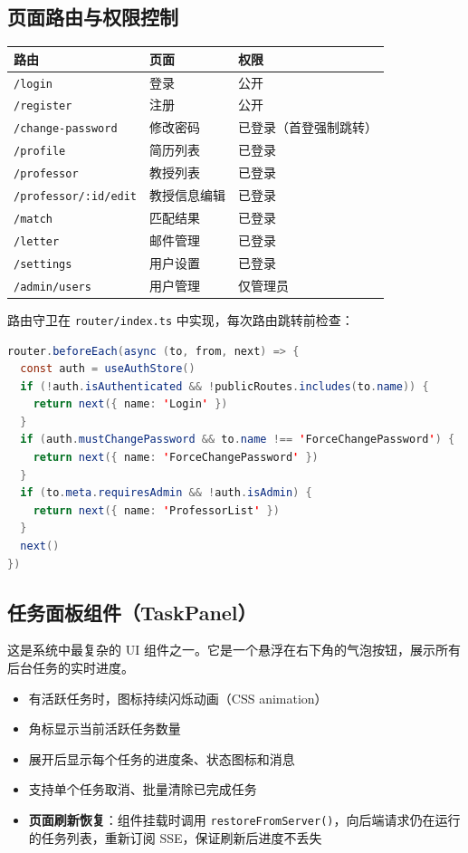 \documentclass[11pt]{article}
\begin{document}
\subsection{页面路由与权限控制}

\begin{center}
\begin{tabular}{|l|l|l|}
\hline
\textbf{路由} & \textbf{页面} & \textbf{权限} \\
\hline
\texttt{/login} & 登录 & 公开 \\
\texttt{/register} & 注册 & 公开 \\
\texttt{/change-password} & 修改密码 & 已登录（首登强制跳转） \\
\texttt{/profile} & 简历列表 & 已登录 \\
\texttt{/professor} & 教授列表 & 已登录 \\
\texttt{/professor/:id/edit} & 教授信息编辑 & 已登录 \\
\texttt{/match} & 匹配结果 & 已登录 \\
\texttt{/letter} & 邮件管理 & 已登录 \\
\texttt{/settings} & 用户设置 & 已登录 \\
\texttt{/admin/users} & 用户管理 & 仅管理员 \\
\hline
\end{tabular}
\end{center}

路由守卫在 \texttt{router/index.ts} 中实现，每次路由跳转前检查：

\begin{lstlisting}[language=Java, caption=Vue Router 全局前置守卫]
router.beforeEach(async (to, from, next) => {
  const auth = useAuthStore()
  if (!auth.isAuthenticated && !publicRoutes.includes(to.name)) {
    return next({ name: 'Login' })
  }
  if (auth.mustChangePassword && to.name !== 'ForceChangePassword') {
    return next({ name: 'ForceChangePassword' })
  }
  if (to.meta.requiresAdmin && !auth.isAdmin) {
    return next({ name: 'ProfessorList' })
  }
  next()
})
\end{lstlisting}

\subsection{任务面板组件（TaskPanel）}

这是系统中最复杂的 UI 组件之一。它是一个悬浮在右下角的气泡按钮，展示所有后台任务的实时进度。

\begin{itemize}
    \item 有活跃任务时，图标持续闪烁动画（CSS animation）
    \item 角标显示当前活跃任务数量
    \item 展开后显示每个任务的进度条、状态图标和消息
    \item 支持单个任务取消、批量清除已完成任务
    \item \textbf{页面刷新恢复}：组件挂载时调用 \texttt{restoreFromServer()}，向后端请求仍在运行的任务列表，重新订阅 SSE，保证刷新后进度不丢失
\end{itemize}
\end{document}
